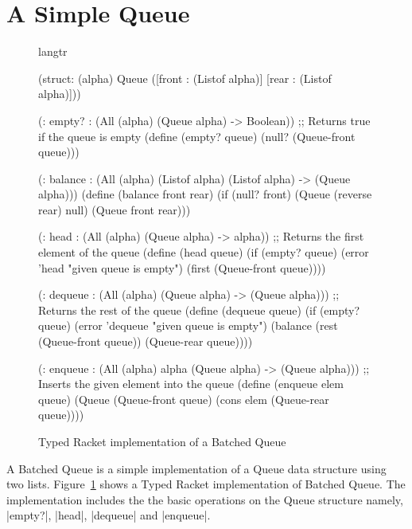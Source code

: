 \section{A Simple Queue}

\begin{figure}
\begin{datastructure}
\begin{schemedisplay}
  langtr
  
   (struct: (alpha) Queue 
     ([front : (Listof alpha)]
      [rear  : (Listof alpha)]))

   (: empty? : (All (alpha) (Queue alpha) -> Boolean))
   ;; Returns true if the queue is empty
   (define (empty? queue)
     (null? (Queue-front queue)))

   (: balance : (All (alpha) (Listof alpha) (Listof alpha) -> (Queue alpha)))
   (define (balance front rear)
     (if (null? front)
         (Queue (reverse rear) null)
         (Queue front rear)))

   (: head : (All (alpha) (Queue alpha) -> alpha))
   ;; Returns the first element of the queue
   (define (head queue)
     (if (empty? queue)
         (error 'head "given queue is empty")
         (first (Queue-front queue))))

   (: dequeue : (All (alpha) (Queue alpha) -> (Queue alpha)))
   ;; Returns the rest of the queue
   (define (dequeue queue)
     (if (empty? queue)
         (error 'dequeue "given queue is empty")
         (balance (rest (Queue-front queue)) (Queue-rear queue))))

   (: enqueue : (All (alpha) alpha (Queue alpha) -> (Queue alpha)))
   ;; Inserts the given element into the queue
   (define (enqueue elem queue)
     (Queue (Queue-front queue)
            (cons elem (Queue-rear queue))))

\end{schemedisplay}
\end{datastructure}
\caption{Typed Racket implementation of a Batched Queue}
\label{fig:queueds}
\end{figure}
A Batched Queue is a simple implementation of a Queue data structure
using two lists. Figure~\ref{fig:queueds} shows a Typed Racket
implementation of Batched Queue. The implementation includes the the
basic operations on the Queue structure namely, \scheme|empty?|,
\scheme|head|, \scheme|dequeue| and \scheme|enqueue|.

% 


